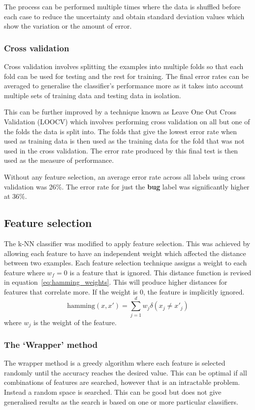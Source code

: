The process can be performed multiple times where the data is shuffled before each case to reduce the uncertainty and obtain
standard deviation values which show the variation or the amount of error.

\subsubsection{Cross validation}
Cross validation involves splitting the examples into multiple folds so that each fold can be used for testing and the rest for
training. The final error rates can be averaged to generalise the classifier's performance more as it takes into account
multiple sets of training data and testing data in isolation.

This can be further improved by a technique known as Leave One Out Cross Validation (LOOCV) which involves performing cross
validation on all but one of the folds the data is split into. The folds that give the lowest error rate when used as training
data is then used as the training data for the fold that was not used in the cross validation. The error rate produced by this
final test is then used as the measure of performance.

Without any feature selection, an average error rate across all labels using cross validation was 26\%. The error rate for just
the \textbf{bug} label was significantly higher at 36\%.

\subsection{Feature selection}
The k-NN classifier was modified to apply feature selection. This was achieved by allowing each feature to have an independent
weight which affected the distance between two examples. Each feature selection technique assigns a weight to each feature where
$w_f = 0$ is a feature that is ignored. This distance function is revised in equation~\ref{eq:hamming_weights}. This will
produce higher distances for features that correlate more. If the weight is 0, the feature is implicitly ignored.
\begin{equation}
	\label{eq:hamming_weights}
	\mathrm{hamming}(x,x') = \sum^d_{j=1} w_{j} \delta (x_{j} \neq x'_{j})
\end{equation}
where $w_{j}$ is the weight of the feature.

\subsubsection{The `Wrapper' method}
The wrapper method is a greedy algorithm where each feature is selected randomly until the accuracy reaches the desired value.
This can be optimal if all combinations of features are searched, however that is an intractable problem. Instead a random space
is searched. This can be good but does not give generalised results as the search is based on one or more particular
classifiers.

